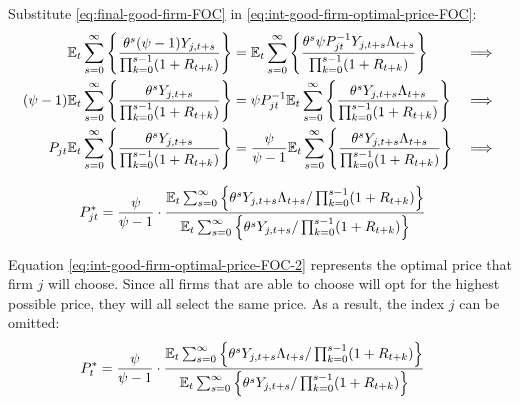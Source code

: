 \documentclass[
thesis.tex
]{subfiles}
\begin{document}
	
	Substitute \ref{eq:final-good-firm-FOC} in \ref{eq:int-good-firm-optimal-price-FOC}:
	\begin{alignat}{2}
		{\mathbb{E}_{t}} \sum_{s=0}^{\infty} \Bigg\{ \frac{\theta^s (\psi-1) Y_{j,t+s}}{\prod_{k=0}^{s-1}(1+R_{t+k})} \Bigg\} &= {\mathbb{E}_{t}} \sum_{s=0}^{\infty} \Bigg\{ \frac{\theta^s \psi P_{jt}^{-1} Y_{j,t+s} \Lambda_{t+s}}{\prod_{k=0}^{s-1}(1+R_{t+k})}  \Bigg\} &\implies \nonumber \\
		(\psi-1) {\mathbb{E}_{t}} \sum_{s=0}^{\infty} \Bigg\{ \frac{\theta^s Y_{j,t+s}}{\prod_{k=0}^{s-1}(1+R_{t+k})} \Bigg\} &= \psi P_{jt}^{-1} {\mathbb{E}_{t}} \sum_{s=0}^{\infty} \Bigg\{ \frac{\theta^s Y_{j,t+s} \Lambda_{t+s}}{\prod_{k=0}^{s-1}(1+R_{t+k})}  \Bigg\} &\implies \nonumber \\
		P_{jt} {\mathbb{E}_{t}} \sum_{s=0}^{\infty} \Bigg\{ \frac{\theta^s Y_{j,t+s}}{\prod_{k=0}^{s-1}(1+R_{t+k})} \Bigg\} &= \frac{\psi}{\psi-1} {\mathbb{E}_{t}} \sum_{s=0}^{\infty} \Bigg\{ \frac{\theta^s Y_{j,t+s} \Lambda_{t+s}}{\prod_{k=0}^{s-1}(1+R_{t+k})}  \Bigg\} &\implies \nonumber
	\end{alignat}
	
	\vspace*{-1cm}
	
	\begin{align}
		\label{eq:int-good-firm-optimal-price-FOC-2}
		P_{jt}^\ast &= 
		\frac{\psi}{\psi-1} \cdot
		\frac{
			{\mathbb{E}_{t}} \sum_{s=0}^{\infty} \left\{ 
			\theta^s Y_{j,t+s} \Lambda_{t+s} / \prod_{k=0}^{s-1}(1+R_{t+k}) \right\} } {{\mathbb{E}_{t}} \sum_{s=0}^{\infty} \left\{
			\theta^s Y_{j,t+s} / \prod_{k=0}^{s-1}(1+R_{t+k}) \right\}}
	\end{align}
	
	
	Equation \ref{eq:int-good-firm-optimal-price-FOC-2} represents the optimal price that firm $j$ will choose. Since all firms that are able to choose will opt for the highest possible price, they will all select the same price. As a result, the index $j$ can be omitted:
	\begin{align}
		\label{eq:int-good-firm-optimal-price-FOC-3}
		P_t^\ast &= 
		\frac{\psi}{\psi-1} \cdot
		\frac{
			{\mathbb{E}_{t}} \sum_{s=0}^{\infty} \left\{ 
			\theta^s Y_{j,t+s} \Lambda_{t+s} / \prod_{k=0}^{s-1}(1+R_{t+k}) \right\} } {{\mathbb{E}_{t}} \sum_{s=0}^{\infty} \left\{
			\theta^s Y_{j,t+s} / \prod_{k=0}^{s-1}(1+R_{t+k}) \right\}}
	\end{align}
	
	
\end{document}
